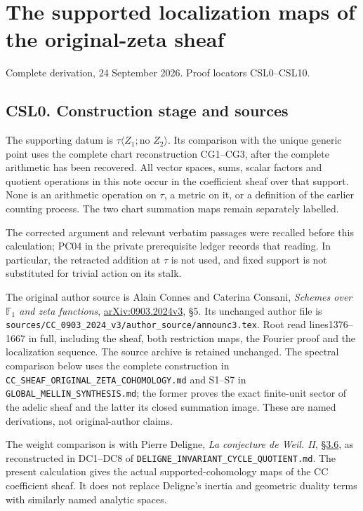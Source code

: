\section{The supported localization maps of the original-zeta
sheaf}\label{the-supported-localization-maps-of-the-original-zeta-sheaf}

Complete derivation, 24 September 2026. Proof locators CSL0--CSL10.

\subsection{CSL0. Construction stage and
sources}\label{csl0.-construction-stage-and-sources}

The supporting datum is \(\tau\langle Z_1;\text{no }Z_2\rangle\). Its
comparison with the unique generic point uses the complete chart
reconstruction CG1--CG3, after the complete arithmetic has been
recovered. All vector spaces, sums, scalar factors and quotient
operations in this note occur in the coefficient sheaf over that
support. None is an arithmetic operation on \(\tau\), a metric on it, or
a definition of the earlier counting process. The two chart summation
maps remain separately labelled.

The corrected argument and relevant verbatim passages were recalled
before this calculation; PC04 in the private prerequisite ledger records
that reading. In particular, the retracted addition at \(\tau\) is not
used, and fixed support is not substituted for trivial action on its
stalk.

The original author source is Alain Connes and Caterina Consani,
\emph{Schemes over \(\mathbb F_1\) and zeta functions},
\href{https://arxiv.org/abs/0903.2024v3}{arXiv:0903.2024v3}, §5. Its
unchanged author file is
\nolinkurl{sources/CC_0903_2024_v3/author_source/announc3.tex}. Root
read lines1376--1667 in full, including the sheaf, both restriction
maps, the Fourier proof and the localization sequence. The source
archive is retained unchanged. The spectral comparison below uses the
complete construction in
\nolinkurl{CC_SHEAF_ORIGINAL_ZETA_COHOMOLOGY.md} and S1--S7 in
\texttt{GLOBAL\_MELLIN\_SYNTHESIS.md}; the former proves the exact
finite-unit sector of the adelic sheaf and the latter its closed
summation image. These are named derivations, not original-author
claims.

The weight comparison is with Pierre Deligne, \emph{La conjecture de
Weil. II},
\href{https://www.numdam.org/item/PMIHES_1980__52__137_0/}{§3.6}, as
reconstructed in DC1--DC8 of
\nolinkurl{DELIGNE_INVARIANT_CYCLE_QUOTIENT.md}. The present calculation
gives the actual supported-cohomology maps of the CC coefficient sheaf.
It does not replace Deligne's inertia and geometric duality terms with
similarly named analytic spaces.

